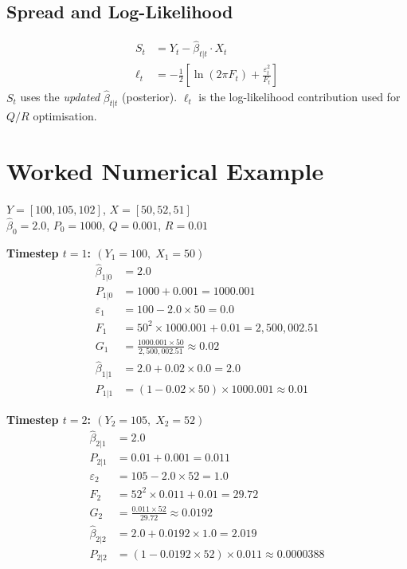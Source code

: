 \documentclass[10pt,a4paper,twocolumn]{article}
\begin{document}
\subsection{Spread and Log-Likelihood}

\begin{tcolorbox}[mathbox={Formula 8 --- Spread and Log-Lik}]
\vspace{-4pt}
\begin{align}
  S_t &= Y_t - \hat\beta_{t|t}\cdot X_t \label{eq:spread}\\
  \ell_t &= -\tfrac{1}{2}\!\left[\ln(2\pi F_t) + \frac{\varepsilon_t^2}{F_t}\right]
  \label{eq:loglik}
\end{align}
\vspace{-4pt}
$S_t$ uses the \emph{updated} $\hat\beta_{t|t}$ (posterior). $\ell_t$ is
the log-likelihood contribution used for $Q/R$ optimisation.
\end{tcolorbox}

\section{Worked Numerical Example}

\begin{tcolorbox}[exbox={Setup}]
$Y = [100, 105, 102]$,\; $X = [50, 52, 51]$\\
$\hat\beta_0 = 2.0$,\; $P_0 = 1000$,\; $Q = 0.001$,\; $R = 0.01$
\end{tcolorbox}

\noindent\textbf{Timestep $t=1$: $(Y_1=100,\; X_1=50)$}
\begin{align*}
  \hat\beta_{1|0} &= 2.0 \\
  P_{1|0} &= 1000 + 0.001 = 1000.001 \\
  \varepsilon_1 &= 100 - 2.0\times50 = 0.0 \\
  F_1 &= 50^2\times1000.001 + 0.01 = 2{,}500{,}002.51 \\
  G_1 &= \frac{1000.001\times50}{2{,}500{,}002.51} \approx 0.02 \\
  \hat\beta_{1|1} &= 2.0 + 0.02\times0.0 = 2.0 \\
  P_{1|1} &= (1 - 0.02\times50)\times1000.001 \approx 0.01
\end{align*}

\noindent\textbf{Timestep $t=2$: $(Y_2=105,\; X_2=52)$}
\begin{align*}
  \hat\beta_{2|1} &= 2.0 \\
  P_{2|1} &= 0.01 + 0.001 = 0.011 \\
  \varepsilon_2 &= 105 - 2.0\times52 = 1.0 \\
  F_2 &= 52^2\times0.011 + 0.01 = 29.72 \\
  G_2 &= \frac{0.011\times52}{29.72} \approx 0.0192 \\
  \hat\beta_{2|2} &= 2.0 + 0.0192\times1.0 = 2.019 \\
  P_{2|2} &= (1 - 0.0192\times52)\times0.011 \approx 0.0000388
\end{align*}
\end{document}
